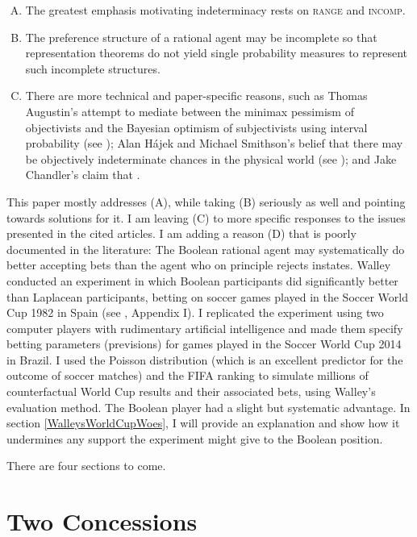 \documentclass[11pt]{article}
\begin{document}
\begin{enumerate}[(A)]
\item The greatest emphasis motivating indeterminacy rests on
  \textsc{range} and \textsc{incomp}.
\item The preference structure of a rational agent may be incomplete
  so that representation theorems do not yield single probability
  measures to represent such incomplete structures.
\item There are more technical and paper-specific reasons, such as
  Thomas Augustin's attempt to mediate between the minimax pessimism
  of objectivists and the Bayesian optimism of subjectivists using
  interval probability (see ); Alan
  H{\'a}jek and Michael Smithson's belief that there may be
  objectively indeterminate chances in the physical world (see
  ); and Jake Chandler's claim that
   .
\end{enumerate}

This paper mostly addresses (A), while taking (B) seriously as well
and pointing towards solutions for it. I am leaving (C) to more
specific responses to the issues presented in the cited articles. I am
adding a reason (D) that is poorly documented in the literature: The
Boolean rational agent may systematically do better accepting bets
than the agent who on principle rejects instates.  Walley conducted an
experiment in which Boolean participants did significantly better than
Laplacean participants, betting on soccer games played in the Soccer
World Cup 1982 in Spain (see , Appendix I). I
replicated the experiment using two computer players with rudimentary
artificial intelligence and made them specify betting parameters
(previsions) for games played in the Soccer World Cup 2014 in Brazil.
I used the Poisson distribution (which is an excellent predictor for
the outcome of soccer matches) and the FIFA ranking to simulate
millions of counterfactual World Cup results and their associated
bets, using Walley's evaluation method.  The Boolean player had a
slight but systematic advantage. In section \ref{WalleysWorldCupWoes},
I will provide an explanation and show how it undermines any support
the experiment might give to the Boolean position.

There are four sections to come.

\section{Two Concessions}
\label{TwoConcessions}
\end{document}
